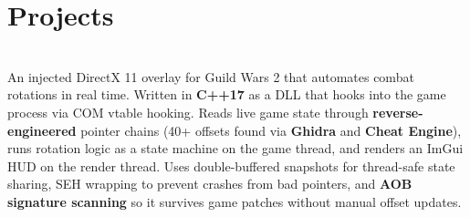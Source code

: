 \documentclass[a4paper,10pt]{extarticle} %
\begin{document}
{%

\section{\textcolor{primary}{Projects}}
\vspace{0.1cm}
\begin{description}
\sloppy

\item[Mistrunner — Guild Wars 2 Combat Automation]\hfill \\
An injected DirectX 11 overlay for Guild Wars 2 that automates combat rotations in real time. Written in \textbf{C++17} as a DLL that hooks into the game process via COM vtable hooking. Reads live game state through \textbf{reverse-engineered} pointer chains (40+ offsets found via \textbf{Ghidra} and \textbf{Cheat Engine}), runs rotation logic as a state machine on the game thread, and renders an ImGui HUD on the render thread. Uses double-buffered snapshots for thread-safe state sharing, SEH wrapping to prevent crashes from bad pointers, and \textbf{AOB signature scanning} so it survives game patches without manual offset updates.

\end{description}


}
\end{document}
